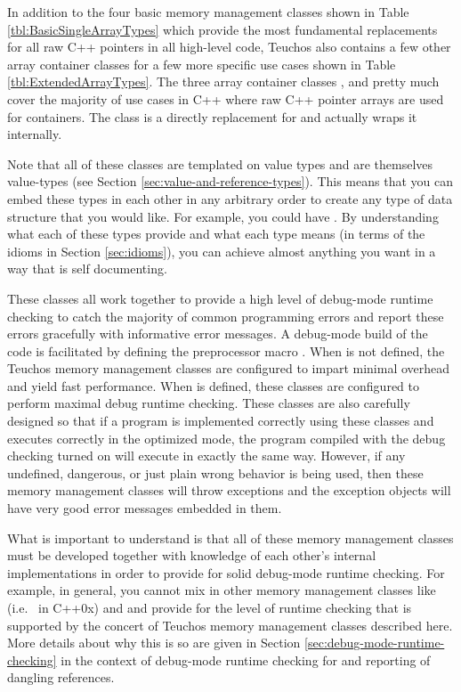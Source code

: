 \documentclass[pdf,ps2pdf,11pt]{SANDreport}
\begin{document}
In addition to the four basic memory management classes shown in Table
{}\ref{tbl:BasicSingleArrayTypes} which provide the most fundamental
replacements for all raw C++ pointers in all high-level code, Teuchos
also contains a few other array container classes for a few more
specific use cases shown in Table {}\ref{tbl:ExtendedArrayTypes}.
The three array container classes {}, and
{} pretty much cover the majority of use cases in C++
where raw C++ pointer arrays are used for containers.  The class
{} is a directly replacement for {}
and actually wraps it internally.

Note that all of these classes are templated on value types and are
themselves value-types (see Section
{}\ref{sec:value-and-reference-types}).  This means that you can
embed these types in each other in any arbitrary order to create any
type of data structure that you would like.  For example, you could
have {}.  By understanding what each of these types provide and what each
type means (in terms of the idioms in Section {}\ref{sec:idioms}), you
can achieve almost anything you want in a way that is self
documenting.

These classes all work together to provide a high level of debug-mode
runtime checking to catch the majority of common programming errors
and report these errors gracefully with informative error messages.  A
debug-mode build of the code is facilitated by defining the
preprocessor macro {}.  When
{} is not defined, the Teuchos memory
management classes are configured to impart minimal overhead and yield
fast performance.  When {} is defined, these
classes are configured to perform maximal debug runtime checking.
These classes are also carefully designed so that if a program is
implemented correctly using these classes and executes correctly in
the optimized mode, the program compiled with the debug checking
turned on will execute in exactly the same way.  However, if any
undefined, dangerous, or just plain wrong behavior is being used, then
these memory management classes will throw exceptions and the
exception objects will have very good error messages embedded in them.

What is important to understand is that all of these memory management
classes must be developed together with knowledge of each other's
internal implementations in order to provide for solid debug-mode
runtime checking.  For example, in general, you cannot mix in other
memory management classes like {} (i.e.\
{} in C++0x) and {} and
provide for the level of runtime checking that is supported by the
concert of Teuchos memory management classes described here.  More
details about why this is so are given in Section
{}\ref{sec:debug-mode-runtime-checking} in the context of debug-mode
runtime checking for and reporting of dangling references.
\end{document}
